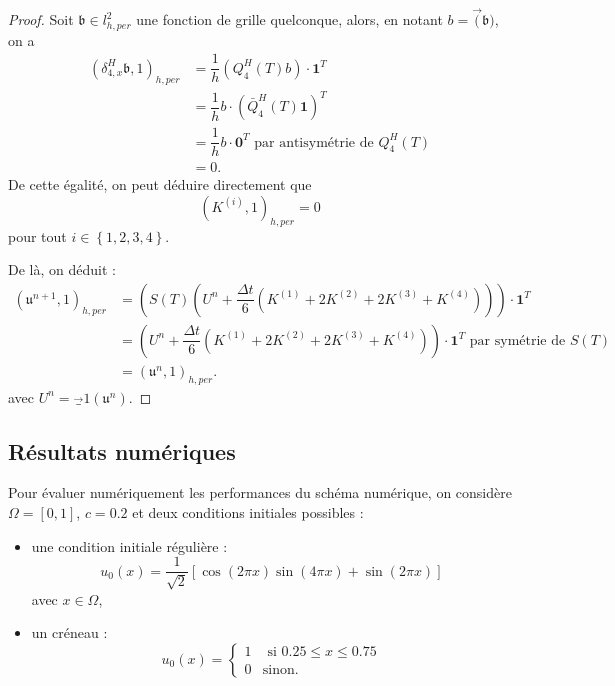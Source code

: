 \begin{proof}
Soit $\mathfrak{b} \in l^2_{h,per}$ une fonction de grille quelconque, alors, en notant $b=\vec(\mathfrak{b})$, on a
\begin{align*}
(\delta_{4,x}^H \mathfrak{b}, \mathfrak{1})_{h,per} & = \dfrac{1}{h} \left( Q_4^H(T) b \right) \cdot \mathbf{1}^T \\
	& = \dfrac{1}{h} b \cdot (\bar{Q}_4^H(T) \mathbf{1})^T \\
	& = \dfrac{1}{h} b \cdot \mathbf{0}^T \text{ par antisymétrie de }Q_4^H(T)\\
	& = 0.
\end{align*}
De cette égalité, on peut déduire directement que
\begin{equation}
(K^{(i)}, \mathfrak{1})_{h,per} = 0
\end{equation}
pour tout $i \in \left\lbrace 1, 2, 3, 4 \right\rbrace$.

De là, on déduit :
\begin{align*}
(\mathfrak{u}^{n+1},\mathfrak{1})_{h,per} & =  \left( S(T) \left( U^n + \dfrac{\Delta t}{6}(K^{(1)}+2K^{(2)}+2K^{(3)}+K^{(4)})  \right) \right) \cdot \mathbf{1}^T \\
	& = \left( U^n + \dfrac{\Delta t}{6}(K^{(1)}+2K^{(2)}+2K^{(3)}+K^{(4)})  \right) \cdot \mathbf{1}^T \text{ par symétrie de } S(T)\\
	& = (\mathfrak{u}^n , \mathfrak{1})_{h,per}.
\end{align*}
avec $U^n = \vec_1(\mathfrak{u}^n)$.
\end{proof}

\subsection{Résultats numériques}

Pour évaluer numériquement les performances du schéma numérique, on considère $\Omega=[0,1]$, $c=0.2$ et deux conditions initiales possibles :
\begin{itemize}
\item une condition initiale régulière :
\begin{equation}
u_0(x) = \dfrac{1}{\sqrt{2}} \left[ \cos (2 \pi x) \sin (4 \pi x) + \sin ( 2 \pi x ) \right]
\label{eq:transport1d_test_reg}
\end{equation}
avec $x \in \Omega$,
\item un créneau :
\begin{equation}
u_0(x) = \left\lbrace
\begin{array}{rl}
1 & \text{ si } 0.25 \leq x \leq 0.75 \\
0 & \text{sinon.}
\end{array}
\right.
\label{eq:transport1d_test_ireg}
\end{equation}
\end{itemize}

